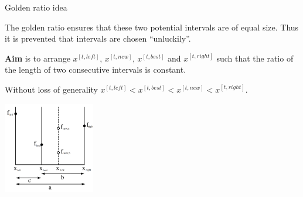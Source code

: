 \documentclass[11pt,compress,t,notes=noshow, xcolor=table]{beamer}
\begin{document}
\begin{vbframe}{Golden ratio idea}

The golden ratio ensures that these two potential intervals are of equal size. Thus it is prevented that intervals are chosen \enquote{unluckily}.

\lz

\textbf{Aim} is to arrange $x^{[t, left]}$, $x^{[t, new]}$, $x^{[t, best]}$ and $x^{[t, right]}$ such that the ratio of the length of two consecutive intervals is constant.

\framebreak

Without loss of generality $x^{[t, left]}< x^{[t, best]}<x^{[t, new]}<x^{[t, right]}$. \\

\vspace*{-0.3cm}

\begin{center}
\includegraphics[width = 0.3\textwidth]{figure_man/goldensec.png}
\end{center}

\vspace*{-0.5cm}

\begin{itemize}








\end{itemize}
\end{vbframe}
\end{document}
